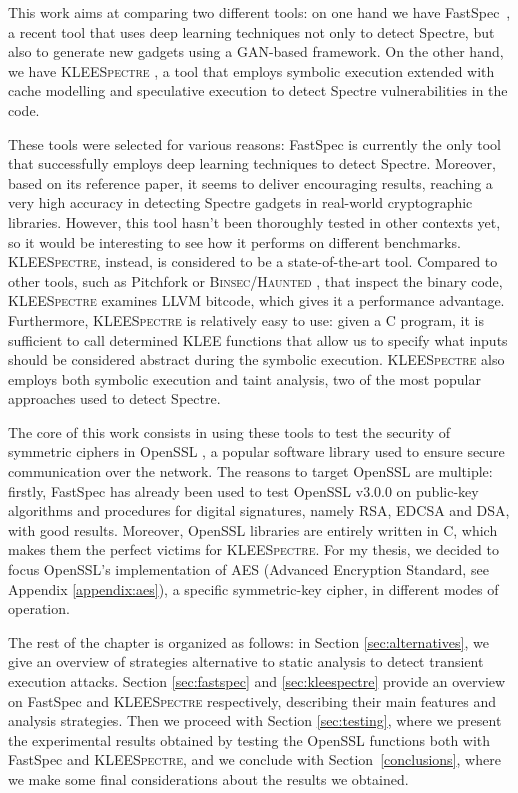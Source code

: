 \documentclass[target=mst,aauheader=aics]{thud}
\theoremstyle{definition}
\begin{document}
	This work aims at comparing two different tools: on one hand we have FastSpec~\cite{Tol2021}, a recent tool that uses deep learning techniques not only to detect Spectre, but also to generate new gadgets using a GAN-based framework. On the other hand, we have \textsc{KLEESpectre} \cite{Wang2020}, a tool that employs symbolic execution extended with cache modelling and speculative execution to detect Spectre vulnerabilities in the code. 
	
	These tools were selected for various reasons: FastSpec is currently the only tool that successfully employs deep learning techniques to detect Spectre. Moreover, based on its reference paper, it seems  to deliver encouraging results, reaching a very high accuracy in detecting Spectre gadgets in real-world cryptographic libraries. However, this tool hasn't been thoroughly tested in other contexts yet, so it would be interesting to see how it performs on different benchmarks. \textsc{KLEESpectre}, instead, is considered to be a state-of-the-art tool. Compared to other tools, such as Pitchfork or \textsc{Binsec/Haunted} \cite{Daniel2021}, that inspect the binary code, \textsc{KLEESpectre} examines LLVM bitcode, which gives it a performance advantage. Furthermore, \textsc{KLEESpectre} is relatively easy to use: given a C program, it is sufficient to call determined \textsc{KLEE} functions that allow us to specify what inputs should be considered abstract during the symbolic execution. \textsc{KLEESpectre} also employs both symbolic execution and taint analysis, two of the most popular approaches used to detect Spectre.
	
	The core of this work consists in using these tools to test the security of symmetric ciphers in OpenSSL \cite{OpenSSL}, a popular software library used to ensure secure communication over the network. The reasons to target OpenSSL are multiple: firstly, FastSpec has already been used to test OpenSSL v3.0.0 on public-key algorithms and procedures for digital signatures, namely RSA, EDCSA and DSA, with good results. Moreover, OpenSSL libraries are entirely written in C, which makes them the perfect victims for \textsc{KLEESpectre}. For my thesis, we decided to focus OpenSSL's implementation of AES (Advanced Encryption Standard, see Appendix \ref{appendix:aes}), a specific symmetric-key cipher, in different modes of operation. 
	
	The rest of the chapter is organized as follows: in Section \ref{sec:alternatives}, we give an overview of strategies alternative to static analysis to detect transient execution attacks. Section \ref{sec:fastspec} and \ref{sec:kleespectre} provide an overview on FastSpec and \textsc{KLEESpectre} respectively, describing their main features and analysis strategies. Then we proceed with Section \ref{sec:testing}, where we present the experimental results obtained by testing the OpenSSL functions both with FastSpec and \textsc{KLEESpectre}, and we conclude with Section~\ref{conclusions}, where we make some final considerations about the results we obtained. 
	
\end{document}
